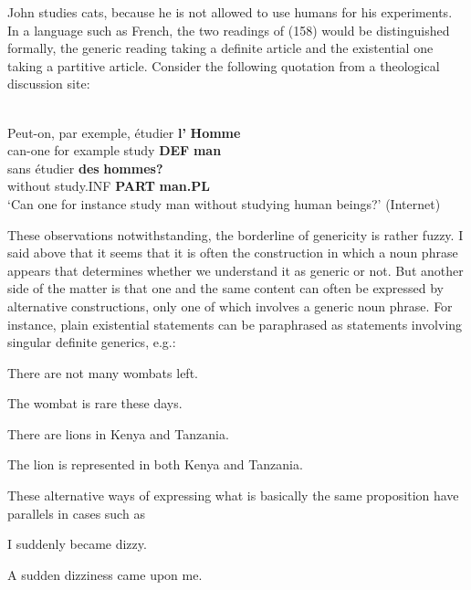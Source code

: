 \ea 
\gl \label{bkm:Ref107049114}John studies cats, because he is not allowed to use humans for his experiments. 
\z 
In a language such as French, the two readings of (158) would be distinguished formally, the generic reading taking a definite article and the existential one taking a partitive article. Consider the following quotation from a theological discussion site:


\ea \label{} 
\\
\gll Peut-on,  par  exemple,  étudier  \textbf{l’} \textbf{ Homme}\\
can-one  for  example  study  \textbf{DEF } \textbf{man}\\
\gll sans  étudier  \textbf{des} \textbf{hommes?} \\
without  study.INF  \textbf{PART} \textbf{man.PL} \\
\glt ‘Can one for instance study man without studying human beings?’ (Internet)

\z

These observations notwithstanding, the borderline of genericity is rather fuzzy. I said above that it seems that it is often the construction in which a noun phrase appears that determines whether we understand it as generic or not. But another side of the matter is that one and the same content can often be expressed by alternative constructions, only one of which involves a generic noun phrase. For instance, plain existential statements can be paraphrased as statements involving singular definite generics, e.g.:

\ea
\gl There are not many wombats left.  
 \z

\ea 
\gl The wombat is rare these days.
\z 

\ea 
\gl There are lions in Kenya and Tanzania.
\z 

\ea
\gl The lion is represented in both Kenya and Tanzania. 
\z 

These alternative ways of expressing what is basically the same proposition have parallels in cases such as

\ea
\gl \label{bkm:Ref107116648}I suddenly became dizzy.  
 \z

\ea 
\gl \label{bkm:Ref107116651}A sudden dizziness came upon me.
\z 

